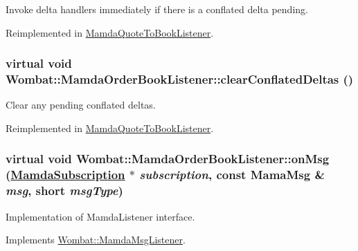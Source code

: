 Invoke delta handlers immediately if there is a conflated delta pending. 



Reimplemented in \hyperlink{classMamdaQuoteToBookListener_a87a519f30dd56c678cc0a847e090d26}{Mamda\-Quote\-To\-Book\-Listener}.\hypertarget{classWombat_1_1MamdaOrderBookListener_46cdfacfe189842f46e8592eceff6724}{
\subsubsection[clearConflatedDeltas]{\setlength{\rightskip}{0pt plus 5cm}virtual void Wombat::Mamda\-Order\-Book\-Listener::clear\-Conflated\-Deltas ()}}
\label{classWombat_1_1MamdaOrderBookListener_46cdfacfe189842f46e8592eceff6724}


Clear any pending conflated deltas. 



Reimplemented in \hyperlink{classMamdaQuoteToBookListener_ea724b9d69c544572dcfab7c8c002d18}{Mamda\-Quote\-To\-Book\-Listener}.\hypertarget{classWombat_1_1MamdaOrderBookListener_25b4001c57c2a140040baad9f84bbec4}{
\subsubsection[onMsg]{\setlength{\rightskip}{0pt plus 5cm}virtual void Wombat::Mamda\-Order\-Book\-Listener::on\-Msg (\hyperlink{classWombat_1_1MamdaSubscription}{Mamda\-Subscription} $\ast$ {\em subscription}, const Mama\-Msg \& {\em msg}, short {\em msg\-Type})}}
\label{classWombat_1_1MamdaOrderBookListener_25b4001c57c2a140040baad9f84bbec4}


Implementation of Mamda\-Listener interface. 



Implements \hyperlink{classWombat_1_1MamdaMsgListener_c700829ebcce095b95b8b67b39a1c67d}{Wombat::Mamda\-Msg\-Listener}.


